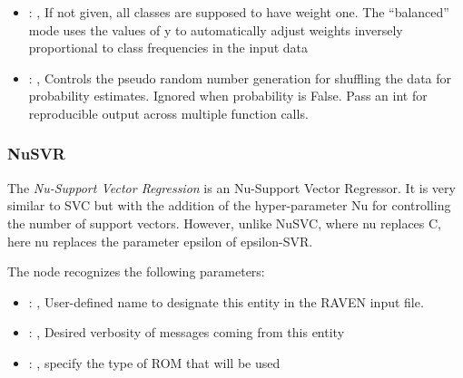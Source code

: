 \begin{itemize}
    \item {}: \xmlDesc{[balanced]}, 
      If not given, all classes are supposed to have weight one.
      The “balanced” mode uses the values of y to automatically adjust weights
      inversely proportional to class frequencies in the input data

    \item {}: , 
      Controls the pseudo random number generation for shuffling
      the data for probability estimates. Ignored when probability is False.
      Pass an int for reproducible output across multiple function calls.
  \end{itemize}


\subsubsection{NuSVR}
  The  \textit{Nu-Support Vector Regression} is an Nu-Support Vector Regressor.
  It is very similar to SVC but with the addition of the hyper-parameter Nu for controlling the
  number of support vectors. However, unlike NuSVC, where nu replaces C,
  here nu replaces the parameter epsilon of epsilon-SVR.

  The  node recognizes the following parameters:
    \begin{itemize}
      \item {}: , 
        User-defined name to designate this entity in the RAVEN input file.
      \item {}: , 
        Desired verbosity of messages coming from this entity
      \item {}: , 
        specify the type of ROM that will be used
  \end{itemize}

